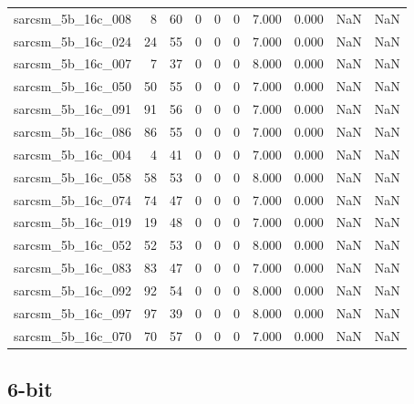 \documentclass{article}
\begin{document}
\begin{longtable}{lrrrrrrrrr}
sarcsm\_5b\_16c\_008 & 8 & 60 & 0 & 0 & 0 & 7.000 & 0.000 & NaN & NaN \\
sarcsm\_5b\_16c\_024 & 24 & 55 & 0 & 0 & 0 & 7.000 & 0.000 & NaN & NaN \\
sarcsm\_5b\_16c\_007 & 7 & 37 & 0 & 0 & 0 & 8.000 & 0.000 & NaN & NaN \\
sarcsm\_5b\_16c\_050 & 50 & 55 & 0 & 0 & 0 & 7.000 & 0.000 & NaN & NaN \\
sarcsm\_5b\_16c\_091 & 91 & 56 & 0 & 0 & 0 & 7.000 & 0.000 & NaN & NaN \\
sarcsm\_5b\_16c\_086 & 86 & 55 & 0 & 0 & 0 & 7.000 & 0.000 & NaN & NaN \\
sarcsm\_5b\_16c\_004 & 4 & 41 & 0 & 0 & 0 & 7.000 & 0.000 & NaN & NaN \\
sarcsm\_5b\_16c\_058 & 58 & 53 & 0 & 0 & 0 & 8.000 & 0.000 & NaN & NaN \\
sarcsm\_5b\_16c\_074 & 74 & 47 & 0 & 0 & 0 & 7.000 & 0.000 & NaN & NaN \\
sarcsm\_5b\_16c\_019 & 19 & 48 & 0 & 0 & 0 & 7.000 & 0.000 & NaN & NaN \\
sarcsm\_5b\_16c\_052 & 52 & 53 & 0 & 0 & 0 & 8.000 & 0.000 & NaN & NaN \\
sarcsm\_5b\_16c\_083 & 83 & 47 & 0 & 0 & 0 & 7.000 & 0.000 & NaN & NaN \\
sarcsm\_5b\_16c\_092 & 92 & 54 & 0 & 0 & 0 & 8.000 & 0.000 & NaN & NaN \\
sarcsm\_5b\_16c\_097 & 97 & 39 & 0 & 0 & 0 & 8.000 & 0.000 & NaN & NaN \\
sarcsm\_5b\_16c\_070 & 70 & 57 & 0 & 0 & 0 & 7.000 & 0.000 & NaN & NaN \\
\end{longtable}

\subsection*{6-bit}
\end{document}
